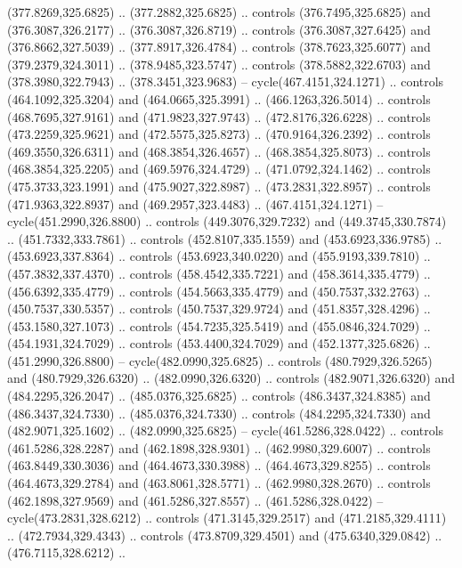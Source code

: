 \begin{scope}[cm={{1.25,0.0,0.0,-1.25,(0.0,743.43331)}}]
    (377.8269,325.6825) .. (377.2882,325.6825) .. controls (376.7495,325.6825) and
    (376.3087,326.2177) .. (376.3087,326.8719) .. controls (376.3087,327.6425) and
    (376.8662,327.5039) .. (377.8917,326.4784) .. controls (378.7623,325.6077) and
    (379.2379,324.3011) .. (378.9485,323.5747) .. controls (378.5882,322.6703) and
    (378.3980,322.7943) .. (378.3451,323.9683) -- cycle(467.4151,324.1271) ..
    controls (464.1092,325.3204) and (464.0665,325.3991) .. (466.1263,326.5014) ..
    controls (468.7695,327.9161) and (471.9823,327.9743) .. (472.8176,326.6228) ..
    controls (473.2259,325.9621) and (472.5575,325.8273) .. (470.9164,326.2392) ..
    controls (469.3550,326.6311) and (468.3854,326.4657) .. (468.3854,325.8073) ..
    controls (468.3854,325.2205) and (469.5976,324.4729) .. (471.0792,324.1462) ..
    controls (475.3733,323.1991) and (475.9027,322.8987) .. (473.2831,322.8957) ..
    controls (471.9363,322.8937) and (469.2957,323.4483) .. (467.4151,324.1271) --
    cycle(451.2990,326.8800) .. controls (449.3076,329.7232) and
    (449.3745,330.7874) .. (451.7332,333.7861) .. controls (452.8107,335.1559) and
    (453.6923,336.9785) .. (453.6923,337.8364) .. controls (453.6923,340.0220) and
    (455.9193,339.7810) .. (457.3832,337.4370) .. controls (458.4542,335.7221) and
    (458.3614,335.4779) .. (456.6392,335.4779) .. controls (454.5663,335.4779) and
    (450.7537,332.2763) .. (450.7537,330.5357) .. controls (450.7537,329.9724) and
    (451.8357,328.4296) .. (453.1580,327.1073) .. controls (454.7235,325.5419) and
    (455.0846,324.7029) .. (454.1931,324.7029) .. controls (453.4400,324.7029) and
    (452.1377,325.6826) .. (451.2990,326.8800) -- cycle(482.0990,325.6825) ..
    controls (480.7929,326.5265) and (480.7929,326.6320) .. (482.0990,326.6320) ..
    controls (482.9071,326.6320) and (484.2295,326.2047) .. (485.0376,325.6825) ..
    controls (486.3437,324.8385) and (486.3437,324.7330) .. (485.0376,324.7330) ..
    controls (484.2295,324.7330) and (482.9071,325.1602) .. (482.0990,325.6825) --
    cycle(461.5286,328.0422) .. controls (461.5286,328.2287) and
    (462.1898,328.9301) .. (462.9980,329.6007) .. controls (463.8449,330.3036) and
    (464.4673,330.3988) .. (464.4673,329.8255) .. controls (464.4673,329.2784) and
    (463.8061,328.5771) .. (462.9980,328.2670) .. controls (462.1898,327.9569) and
    (461.5286,327.8557) .. (461.5286,328.0422) -- cycle(473.2831,328.6212) ..
    controls (471.3145,329.2517) and (471.2185,329.4111) .. (472.7934,329.4343) ..
    controls (473.8709,329.4501) and (475.6340,329.0842) .. (476.7115,328.6212) ..

\end{scope}
